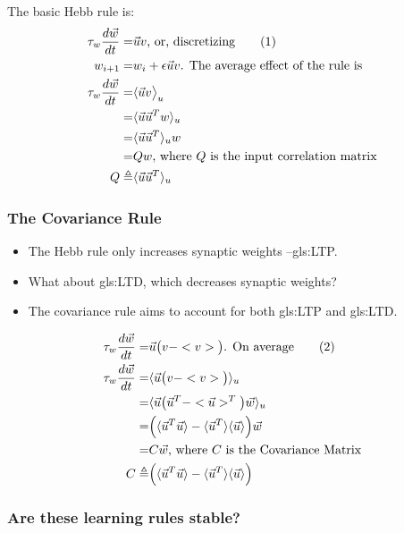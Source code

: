 \documentclass[]{article}
\newcommand\numberthis{\addtocounter{equation}{1}\tag{\theequation}}
\begin{document}
The basic Hebb rule is:
\begin{align*}
	\tau_w \frac{d\vec{w}}{dt} =& \vec{u} v\text{, or, discretizing} \numberthis \label{eq:hebbs:rule}\\
	w_{i+1} =& w_i + \epsilon  \vec{u} v \text{. The average effect of the rule is}\\
	\tau_w \frac{d\vec{w}}{dt} =& \langle\vec{u} v\big>_u\\
	 =& \langle\vec{u} \vec{u}^Tw\rangle_u\\
	 =& \langle\vec{u} \vec{u}^T\rangle_u w\\
	 =& Qw \text{, where $Q$ is the input correlation matrix}\\
	 Q \triangleq& \langle\vec{u} \vec{u}^T\rangle_u
\end{align*}

\subsubsection{The Covariance Rule}
\begin{itemize}
	\item The Hebb rule only increases synaptic weights --\gls{gls:LTP}.
	\item  What about \gls{gls:LTD}, which decreases synaptic weights?
	\item  The covariance rule aims to account for both \gls{gls:LTP} and \gls{gls:LTD}.
\end{itemize}

\begin{align*}
	\tau_w \frac{d\vec{w}}{dt} =& \vec{u}\big(v-<v>\big) \text{. On average} \numberthis \label{eq:covariance:rule}\\
	\tau_w \frac{d\vec{w}}{dt} =& \langle \vec{u}\big(v-<v>\big) \rangle_u\\
	=& \langle \vec{u}\big(\vec{u}^T-<\vec{u}>^T\big) \vec{w}\rangle_u\\
	=& \Big( \langle \vec{u}^T \vec{u}\rangle - \langle \vec{u}^T \rangle \langle\vec{u}\rangle\Big)\vec{w} \\
	=& C \vec{w} \text{, where $C$ is the Covariance Matrix}\\
	C\triangleq& \Big( \langle \vec{u}^T \vec{u}\rangle - \langle \vec{u}^T \rangle \langle\vec{u}\rangle\Big)
\end{align*}

\subsubsection{Are these learning rules stable?}
\end{document}
